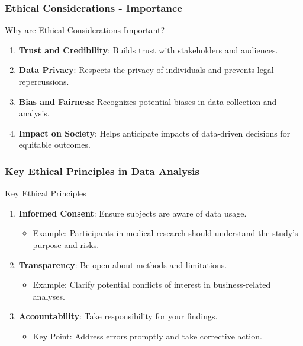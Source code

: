 \documentclass[aspectratio=169]{beamer}
\begin{document}
\begin{frame}[fragile]
    \frametitle{Ethical Considerations - Importance}
    \begin{block}{Why are Ethical Considerations Important?}
        \begin{enumerate}
            \item \textbf{Trust and Credibility}: Builds trust with stakeholders and audiences.
            \item \textbf{Data Privacy}: Respects the privacy of individuals and prevents legal repercussions.
            \item \textbf{Bias and Fairness}: Recognizes potential biases in data collection and analysis.
            \item \textbf{Impact on Society}: Helps anticipate impacts of data-driven decisions for equitable outcomes.
        \end{enumerate}
    \end{block}
\end{frame}

\begin{frame}[fragile]
    \frametitle{Key Ethical Principles in Data Analysis}
    \begin{block}{Key Ethical Principles}
        \begin{enumerate}
            \item \textbf{Informed Consent}: Ensure subjects are aware of data usage.
                \begin{itemize}
                    \item Example: Participants in medical research should understand the study's purpose and risks.
                \end{itemize}
            \item \textbf{Transparency}: Be open about methods and limitations.
                \begin{itemize}
                    \item Example: Clarify potential conflicts of interest in business-related analyses.
                \end{itemize}
            \item \textbf{Accountability}: Take responsibility for your findings.
                \begin{itemize}
                    \item Key Point: Address errors promptly and take corrective action.
                \end{itemize}
        \end{enumerate}
    \end{block}
\end{frame}
\end{document}
